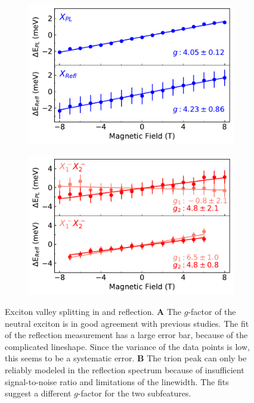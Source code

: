 \begin{figure}[t]
	\begin{subfigure}{0.49\textwidth}
		\caption{}
		\includegraphics[width=\textwidth]{G_X}
	\end{subfigure}
	\begin{subfigure}{0.49\textwidth}
		\caption{}
		\includegraphics[width=\textwidth]{G_T}
	\end{subfigure}
	\caption{Exciton valley splitting in \pl and reflection. \textbf{A} The $g$-factor of the neutral exciton is in good agreement with previous studies. The fit of the reflection measurement has a large error bar, because of the complicated lineshape. Since the variance of the data points is low, this seems to be a systematic error. \textbf{B} The trion peak can only be reliably modeled in the reflection spectrum because of insufficient signal-to-noise ratio and limitations of the linewidth. The fits suggest a different $g$-factor for the two subfeatures.}
	\label{Xfits}
\end{figure}

